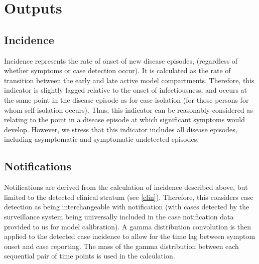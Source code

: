 \section{Outputs}

\subsection{Incidence}
Incidence represents the rate of onset of new disease episodes,
(regardless of whether symptoms or case detection occur).
It is calculated as the rate of transition between the early and late active model compartments.
Therefore, this indicator is slightly lagged relative to the onset of infectiousness,
and occurs at the same point in the disease episode as for case isolation
(for those persons for whom self-isolation occurs).
Thus, this indicator can be reasonably considered as relating to the point in a disease episode
at which significant symptoms would develop.
However, we stress that this indicator includes all disease episodes,
including asymptomatic and symptomatic undetected episodes.

\subsection{Notifications}
Notifications are derived from the calculation of incidence described above,
but limited to the detected clinical stratum (see \ref{clin}).
Therefore, this considers case detection as being interchangeable with notification
(with cases detected by the surveillance system being universally included
in the case notification data provided to us for model calibration).
A gamma distribution convolution is then applied to the detected case incidence to allow for the time lag
between symptom onset and case reporting.  %
The mass of the gamma distribution between each sequential pair of time points is
used in the calculation.

